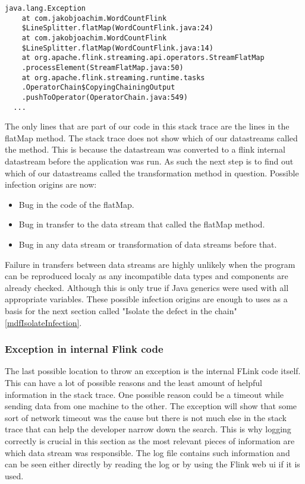 \begin{lstlisting}
java.lang.Exception
	at com.jakobjoachim.WordCountFlink
    $LineSplitter.flatMap(WordCountFlink.java:24)
	at com.jakobjoachim.WordCountFlink
    $LineSplitter.flatMap(WordCountFlink.java:14)
	at org.apache.flink.streaming.api.operators.StreamFlatMap
    .processElement(StreamFlatMap.java:50)
	at org.apache.flink.streaming.runtime.tasks
    .OperatorChain$CopyingChainingOutput
    .pushToOperator(OperatorChain.java:549)
  ...
\end{lstlisting}

The only lines that are part of our code in this stack trace are the lines in the flatMap method. The stack trace does not show which of our datastreams called the method. This is because the datastream was converted to a flink internal datastream before the application was run. As such the next step is to find out which of our datastreams called the transformation method in question. Possible infection origins are now:

\begin{itemize}
  \item Bug in the code of the flatMap.
  \item Bug in transfer to the data stream that called the flatMap method.
  \item Bug in any data stream or transformation of data streams before that.
\end{itemize}

Failure in transfers between data streams are highly unlikely when the program can be reproduced localy as any incompatible data types and components are already checked. Although this is only true if Java generics were used with all appropriate variables. These possible infection origins are enough to uses as a basis for the next section called "Isolate the defect in the chain" \ref{mdfIsolateInfection}.

\subsubsection{Exception in internal Flink code}
The last possible location to throw an exception is the internal FLink code itself. This can have a lot of possible reasons and the least amount of helpful information in the stack trace. One possible reason could be a timeout while sending data from one machine to the other. The exception will show that some sort of network timeout was the cause but there is not much else in the stack trace that can help the developer narrow down the search. This is why logging correctly is crucial in this section as the most relevant pieces of information are which data stream was responsible. The log file contains such information and can be seen either directly by reading the log or by using the Flink web ui if it is used.

